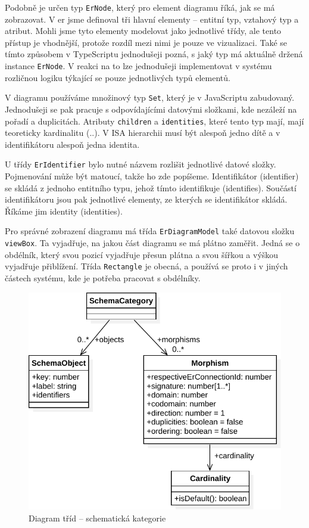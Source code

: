 Podobně je určen typ \texttt{ErNode}, který pro element diagramu říká, jak se má zobrazovat.
V \acrshort{er} jsme definoval tři hlavní elementy -- entitní typ, vztahový typ a atribut.
Mohli jsme tyto elementy modelovat jako jednotlivé třídy, ale tento přístup je vhodnější, protože rozdíl mezi nimi je pouze ve vizualizaci.
Také se tímto způsobem v TypeScriptu jednodušeji pozná, s jaký typ má aktuálně držená instance \texttt{ErNode}.
V reakci na to lze jednodušeji implementovat v systému rozličnou logiku týkající se pouze jednotlivých typů elementů.

V diagramu používáme množinový typ \texttt{Set}, který je v JavaScriptu zabudovaný.
Jednodušeji se pak pracuje s odpovídajícími datovými složkami, kde nezáleží na pořadí a duplicitách.
Atributy \texttt{children} a \texttt{identities}, které tento typ mají, mají teoreticky kardinalitu (\one{}..\many{}).
V ISA hierarchii musí být alespoň jedno dítě a v identifikátoru alespoň jedna identita.

U třídy \texttt{ErIdentifier} bylo nutné názvem rozlišit jednotlivé datové složky.
Pojmenování může být matoucí, takže ho zde popíšeme.
Identifikátor (identifier) se skládá z jednoho entitního typu, jehož tímto identifikuje (identifies).
Součástí identifikátoru jsou pak jednotlivé elementy, ze kterých se identifikátor skládá.
Říkáme jim identity (identities).

Pro správné zobrazení diagramu má třída \texttt{ErDiagramModel} také datovou složku \texttt{viewBox}.
Ta vyjadřuje, na jakou část diagramu se má plátno zaměřit.
Jedná se o obdélník, který svou pozicí vyjadřuje přesun plátna a svou šířkou a výškou vyjadřuje přiblížení.
Třída \texttt{Rectangle} je obecná, a používá se proto i v jiných částech systému, kde je potřeba pracovat s obdélníky.


\begin{figure}[!htb]
  \centering
  \includegraphics[width=\maxwidth{\textwidth}]{../img/diagrams/schemcat-class-diagram.pdf}
  \caption{Diagram tříd -- schematická kategorie}
  \label{fig:schemcat-class-diagram}
\end{figure}

